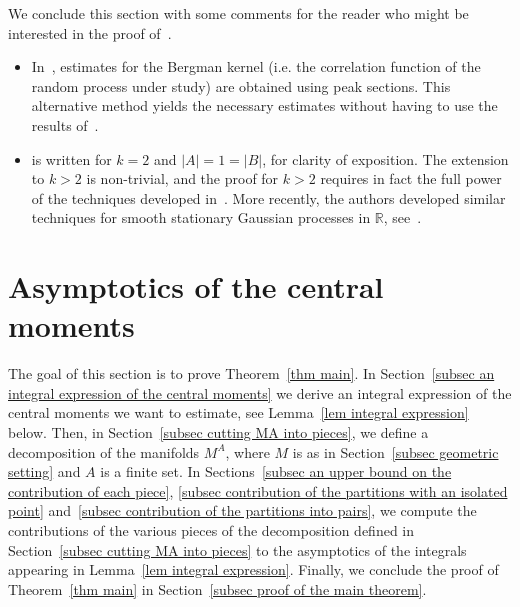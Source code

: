 \documentclass[10pt]{amsart}
\theoremstyle{definition}\newtheorem{defi}[theo]{Definition}\newtheorem{rema}[theo]{Remark}\newtheorem{exam}[theo]{Example}\newtheorem{exem}[theo]{Example}\newtheorem{nota}[theo]{Notation}
\newcommand{\R}{\mathbb{R}}
\begin{document}
\begin{remas}\label{rem Michele's paper}
We conclude this section with some comments for the reader who might be interested in the proof of~\cite[Proposition~3.2]{Anc2019}.
\begin{itemize}
\item In~\cite{Anc2019}, estimates for the Bergman kernel (i.e. the correlation function of the random process under study) are obtained using peak sections. This alternative method yields the necessary estimates without having to use the results of~\cite{MM2007,MM2015}.

\item \cite[the proof of Proposition~3.2]{Anc2019} is written for $k=2$ and $|A|=1=|B|$, for clarity of exposition. The extension to $k >2$ is non-trivial, and the proof for $k >2$ requires in fact the full power of the techniques developed in~\cite[Section~4]{Anc2019}. More recently, the authors developed similar techniques for smooth stationary Gaussian processes in $\R$, see~\cite[Theorem~1.14]{AL2020}.
\end{itemize}
\end{remas}



\section{Asymptotics of the central moments}\label{sec asymptotics of the central moments}

The goal of this section is to prove Theorem~\ref{thm main}. In Section~\ref{subsec an integral expression of the central moments} we derive an integral expression of the central moments we want to estimate, see Lemma~\ref{lem integral expression} below. Then, in Section~\ref{subsec cutting MA into pieces}, we define a decomposition of the manifolds $M^A$, where $M$ is as in Section~\ref{subsec geometric setting} and $A$ is a finite set. In Sections~\ref{subsec an upper bound on the contribution of each piece}, \ref{subsec contribution of the partitions with an isolated point} and~\ref{subsec contribution of the partitions into pairs}, we compute the contributions of the various pieces of the decomposition defined in Section~\ref{subsec cutting MA into pieces} to the asymptotics of the integrals appearing in Lemma~\ref{lem integral expression}. Finally, we conclude the proof of Theorem~\ref{thm main} in Section~\ref{subsec proof of the main theorem}.
\end{document}
